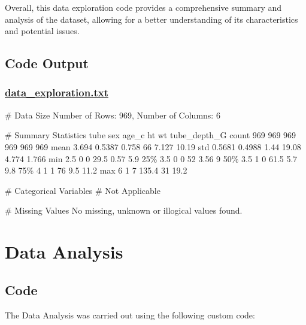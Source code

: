 \documentclass[11pt]{article}
\begin{document}
Overall, this data exploration code provides a comprehensive summary and analysis of the dataset, allowing for a better understanding of its characteristics and potential issues.

\subsection{Code Output}\hypertarget{file-data-exploration-txt}{}

\subsubsection*{\hyperlink{code-Data Exploration-data-exploration-txt}{data\_exploration.txt}}

\begin{codeoutput}
\# Data Size
Number of Rows: 969, Number of Columns: 6

\# Summary Statistics
        tube    sex  age\_c    ht    wt  tube\_depth\_G
count    969    969    969   969   969           969
mean   3.694 0.5387  0.758    66 7.127         10.19
std   0.5681 0.4988   1.44 19.08 4.774         1.766
min      2.5      0      0  29.5  0.57           5.9
25\%      3.5      0      0    52  3.56             9
50\%      3.5      1      0  61.5   5.7           9.8
75\%        4      1      1    76   9.5          11.2
max        6      1      7 135.4    31          19.2

\# Categorical Variables
\# Not Applicable

\# Missing Values
No missing, unknown or illogical values found.
\end{codeoutput}

\section{Data Analysis}
\subsection{{Code}}
The Data Analysis was carried out using the following custom code:
\end{document}
